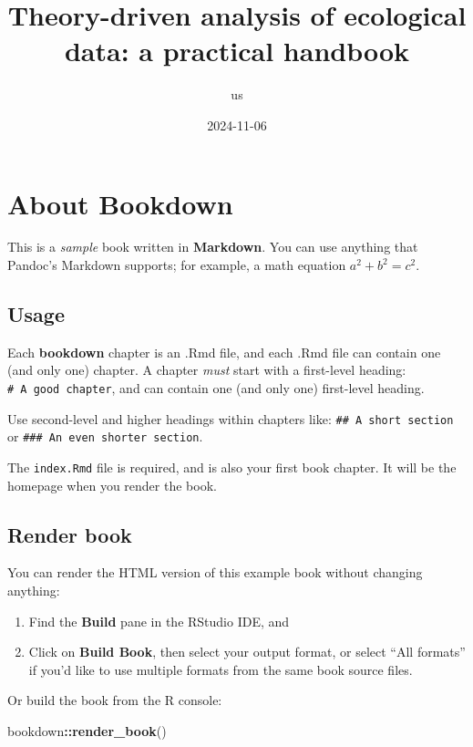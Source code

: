 \documentclass[
]{book}
\title{Theory-driven analysis of ecological data: a practical handbook}
\author{us}
\date{2024-11-06}
\newenvironment{Shaded}{\begin{snugshade}}{\end{snugshade}}
\newcommand{\FunctionTok}[1]{\textcolor[rgb]{0.13,0.29,0.53}{\textbf{#1}}}
\newcommand{\NormalTok}[1]{#1}
\newcommand{\SpecialCharTok}[1]{\textcolor[rgb]{0.81,0.36,0.00}{\textbf{#1}}}
\theoremstyle{definition}
\theoremstyle{definition}
\theoremstyle{definition}
\theoremstyle{definition}
\theoremstyle{remark}
\begin{document}
\maketitle

{
\setcounter{tocdepth}{1}
\tableofcontents
}
\chapter{About Bookdown}\label{about-bookdown}

This is a \emph{sample} book written in \textbf{Markdown}. You can use anything that Pandoc's Markdown supports; for example, a math equation \(a^2 + b^2 = c^2\).

\section{Usage}\label{usage}

Each \textbf{bookdown} chapter is an .Rmd file, and each .Rmd file can contain one (and only one) chapter. A chapter \emph{must} start with a first-level heading: \texttt{\#\ A\ good\ chapter}, and can contain one (and only one) first-level heading.

Use second-level and higher headings within chapters like: \texttt{\#\#\ A\ short\ section} or \texttt{\#\#\#\ An\ even\ shorter\ section}.

The \texttt{index.Rmd} file is required, and is also your first book chapter. It will be the homepage when you render the book.

\section{Render book}\label{render-book}

You can render the HTML version of this example book without changing anything:

\begin{enumerate}
\def\labelenumi{\arabic{enumi}.}
\item
  Find the \textbf{Build} pane in the RStudio IDE, and
\item
  Click on \textbf{Build Book}, then select your output format, or select ``All formats'' if you'd like to use multiple formats from the same book source files.
\end{enumerate}

Or build the book from the R console:

\begin{Shaded}
\begin{Highlighting}[]
\NormalTok{bookdown}\SpecialCharTok{::}\FunctionTok{render\_book}\NormalTok{()}
\end{Highlighting}
\end{Shaded}
\end{document}
